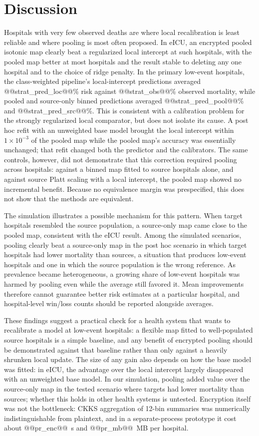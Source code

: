 \documentclass[11pt]{article}
\begin{document}
\section*{Discussion}
Hospitals with very few observed deaths are where local recalibration is least reliable and where pooling is most often proposed. In eICU, an encrypted pooled isotonic map clearly beat a regularized local intercept at such hospitals, with the pooled map better at most hospitals and the result stable to deleting any one hospital and to the choice of ridge penalty. In the primary low-event hospitals, the class-weighted pipeline's local-intercept predictions averaged @@strat_pred_loc@@\% risk against @@strat_obs@@\% observed mortality, while pooled and source-only binned predictions averaged @@strat_pred_pool@@\% and @@strat_pred_src@@\%. This is consistent with a calibration problem for the strongly regularized local comparator, but does not isolate its cause. A post hoc refit with an unweighted base model brought the local intercept within $1\times10^{-3}$ of the pooled map while the pooled map's accuracy was essentially unchanged; that refit changed both the predictor and the calibrators. The same controls, however, did not demonstrate that this correction required pooling across hospitals: against a binned map fitted to source hospitals alone, and against source Platt scaling with a local intercept, the pooled map showed no incremental benefit. Because no equivalence margin was prespecified, this does not show that the methods are equivalent.

The simulation illustrates a possible mechanism for this pattern. When target hospitals resembled the source population, a source-only map came close to the pooled map, consistent with the eICU result. Among the simulated scenarios, pooling clearly beat a source-only map in the post hoc scenario in which target hospitals had lower mortality than sources, a situation that produces low-event hospitals and one in which the source population is the wrong reference. As prevalence became heterogeneous, a growing share of low-event hospitals was harmed by pooling even while the average still favored it. Mean improvements therefore cannot guarantee better risk estimates at a particular hospital, and hospital-level win/loss counts should be reported alongside averages.

These findings suggest a practical check for a health system that wants to recalibrate a model at low-event hospitals: a flexible map fitted to well-populated source hospitals is a simple baseline, and any benefit of encrypted pooling should be demonstrated against that baseline rather than only against a heavily shrunken local update. The size of any gain also depends on how the base model was fitted: in eICU, the advantage over the local intercept largely disappeared with an unweighted base model. In our simulation, pooling added value over the source-only map in the tested scenario where targets had lower mortality than sources; whether this holds in other health systems is untested. Encryption itself was not the bottleneck: CKKS aggregation of 12-bin summaries was numerically indistinguishable from plaintext, and in a separate-process prototype it cost about @@pr_enc@@~s and @@pr_mb@@~MB per hospital.
\end{document}
